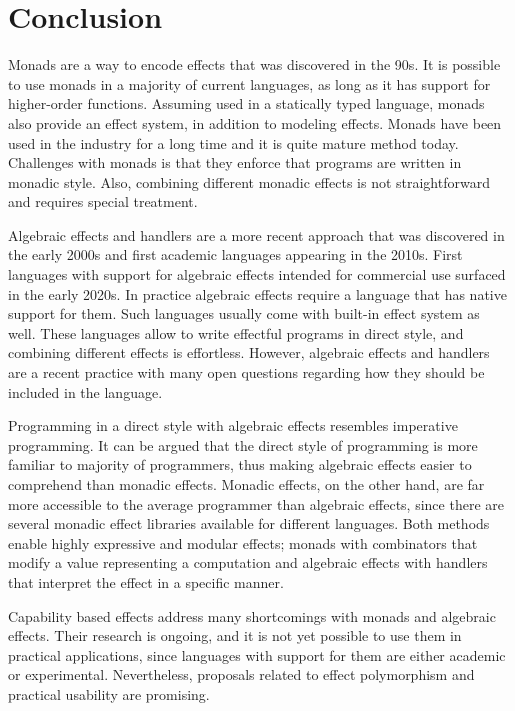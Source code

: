 \chapter{Conclusion}

Monads are a way to encode effects that was discovered in the 90s. It is possible to use monads in a majority of current languages, as long as it has support for higher-order functions. Assuming used in a statically typed language, monads also provide an effect system, in addition to modeling effects. Monads have been used in the industry for a long time and it is quite mature method today. Challenges with monads is that they enforce that programs are written in monadic style. Also, combining different monadic effects is not straightforward and requires special treatment.

Algebraic effects and handlers are a more recent approach that was discovered in the early 2000s and first academic languages appearing in the 2010s. First languages with support for algebraic effects intended for commercial use surfaced in the early 2020s. In practice algebraic effects require a language that has native support for them. Such languages usually come with built-in effect system as well. These languages allow to write effectful programs in direct style, and combining different effects is effortless. However, algebraic effects and handlers are a recent practice with many open questions regarding how they should be included in the language.

Programming in a direct style with algebraic effects resembles imperative programming. It can be argued that the direct style of programming is more familiar to majority of programmers, thus making algebraic effects easier to comprehend than monadic effects. Monadic effects, on the other hand, are far more accessible to the average programmer than algebraic effects, since there are several monadic effect libraries available for different languages. Both methods enable highly expressive and modular effects; monads with combinators that modify a value representing a computation and algebraic effects with handlers that interpret the effect in a specific manner.

Capability based effects address many shortcomings with monads and algebraic effects. Their research is ongoing, and it is not yet possible to use them in practical applications, since languages with support for them are either academic or experimental. Nevertheless, proposals related to effect polymorphism and practical usability are promising.

